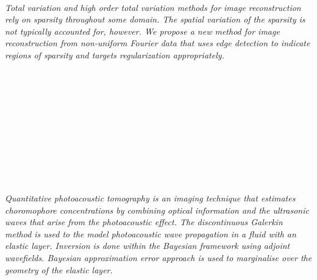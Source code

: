 \begin{multicols}{2}
\\ 
      \\
      \\\\
      \\
      \\\\
      \\
      \\\\
\\
    \textit{Total variation and high order total variation methods for image reconstruction rely on sparsity throughout some domain. The spatial variation of the sparsity is not typically accounted for, however. We propose a new method for image reconstruction from non-uniform Fourier data that uses edge detection to indicate regions of sparsity and targets regularization appropriately.}\\
\\ 
      \\
      \\\\
      \\
      \\\\
      \\
      \\\\
\\
    \textit{Quantitative photoacoustic tomography is an imaging technique that estimates choromophore concentrations by combining optical information and the ultrasonic waves that arise from the photoacoustic effect. The discontinuous Galerkin method is used to the model photoacoustic wave propagation in a fluid with an elastic layer. Inversion is done within the Bayesian framework using adjoint wavefields. Bayesian approximation error approach is used to marginalise over the geometry of the elastic layer.}\\
\\ 
      \\
      \\\\

\end{multicols}
